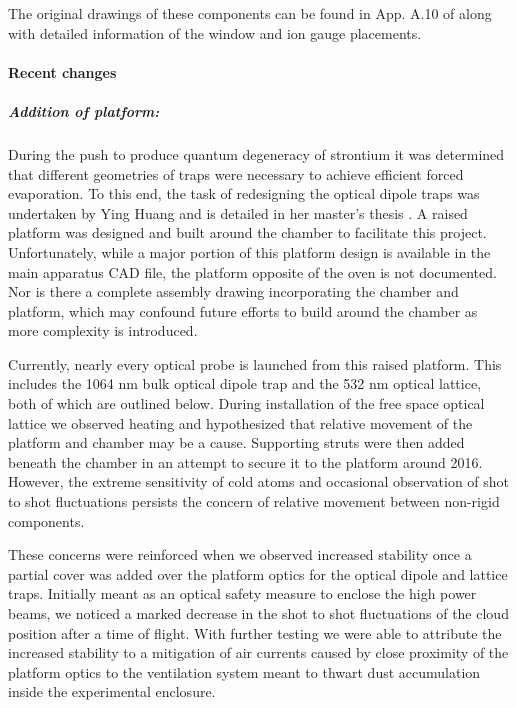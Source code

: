 The original drawings of these components can be found in App. A.10 of \cite{MartinezdeEscolar2010} along with detailed information of the window and ion gauge placements. 

\paragraph{Recent changes}
\subparagraph{Addition of platform:}
During the push to produce quantum degeneracy of strontium it was determined that different geometries of traps were necessary to achieve efficient forced evaporation. 
To this end, the task of redesigning the optical dipole traps was undertaken by Ying Huang and is detailed in her master's thesis \cite{Huang2013}. 
A raised platform was designed and built around the chamber to facilitate this project.
Unfortunately, while a major portion of this platform design is available in the main apparatus CAD file, the platform opposite of the oven is not documented.
Nor is there a complete assembly drawing incorporating the chamber and platform, which may confound future efforts to build around the chamber as more complexity is introduced. 

Currently, nearly every optical probe is launched from this raised platform.
This includes the 1064 nm bulk optical dipole trap and the 532 nm optical lattice, both of which are outlined below. 
During installation of the free space optical lattice we observed heating and hypothesized that relative movement of the platform and chamber may be a cause.
Supporting struts were then added beneath the chamber in an attempt to secure it to the platform around 2016.
However, the extreme sensitivity of cold atoms and occasional observation of shot to shot fluctuations persists the concern of relative movement between non-rigid components.

These concerns were reinforced when we observed increased stability once a partial cover was added over the platform optics for the optical dipole and lattice traps. 
Initially meant as an optical safety measure to enclose the high power beams, we noticed a marked decrease in the shot to shot fluctuations of the cloud position after a time of flight.
With further testing we were able to attribute the increased stability to a mitigation of air currents caused by close proximity of the platform optics to the ventilation system meant to thwart dust accumulation inside the experimental enclosure.

